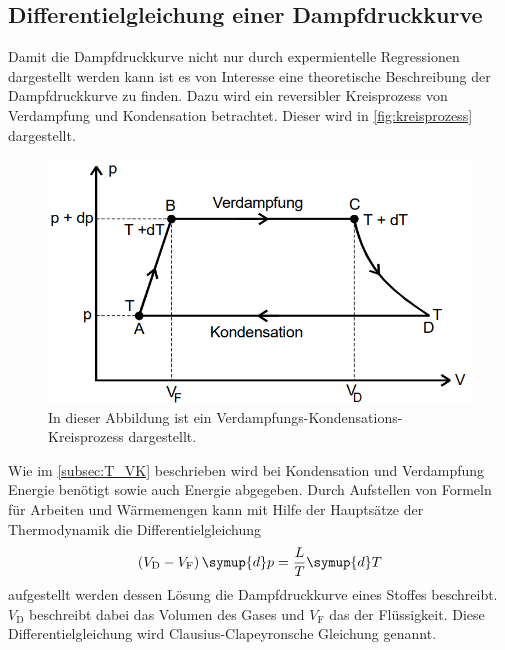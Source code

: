 \subsection{Differentielgleichung einer Dampfdruckkurve}
\label{subsec:T_DGL}
Damit die Dampfdruckkurve nicht nur durch expermientelle Regressionen dargestellt werden kann ist es von Interesse eine theoretische Beschreibung der Dampfdruckkurve zu finden. Dazu wird 
ein reversibler Kreisprozess von Verdampfung und Kondensation betrachtet. Dieser wird in \autoref{fig:kreisprozess} dargestellt.
\begin{figure}
    \centering
    \includegraphics[width=\textwidth]{content/kreisprozess.PNG}
	\caption{In dieser Abbildung ist ein Verdampfungs-Kondensations-Kreisprozess dargestellt. \cite{v203}}
	\label{fig:kreisprozess}
\end{figure}
Wie im \autoref{subsec:T_VK} beschrieben wird bei Kondensation und Verdampfung Energie benötigt sowie auch Energie abgegeben. Durch Aufstellen von Formeln für Arbeiten und Wärmemengen kann mit Hilfe
der Hauptsätze der Thermodynamik die Differentielgleichung 
\begin{equation}
    \label{eqn:DGL1}
    \left(V_\text{D} - V_\text{F}\right)\symup{d}p = \frac{L}{T}\symup{d}T
\end{equation}
aufgestellt werden dessen Lösung die Dampfdruckkurve eines Stoffes beschreibt. $V_\text{D}$ beschreibt dabei das Volumen des Gases und $V_\text{F}$ das der Flüssigkeit.
Diese Differentielgleichung wird Clausius-Clapeyronsche Gleichung genannt.
